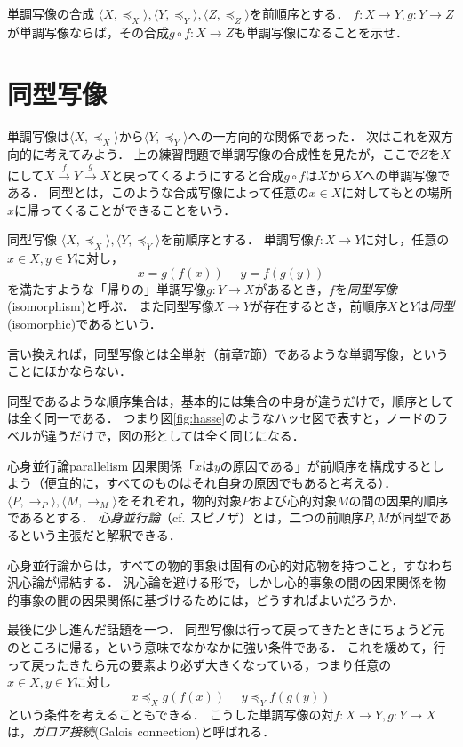 \documentclass[dvipdfmx,11pt,a4paper]{jsarticle}
\begin{document}
\begin{renshu}{単調写像の合成}{}
$\langle X, \preceq_X \rangle, \langle Y, \preceq_Y \rangle, \langle Z, \preceq_Z \rangle$を前順序とする．
$f:X \to Y, g:Y \to Z$が単調写像ならば，その合成$g \circ f: X \to Z$も単調写像になることを示せ． 
\end{renshu}


\section{同型写像}
単調写像は$\langle X, \preceq_X \rangle$から$\langle Y, \preceq_Y \rangle$への一方向的な関係であった．
次はこれを双方向的に考えてみよう．
上の練習問題で単調写像の合成性を見たが，ここで$Z$を$X$にして$X \xrightarrow{f} Y \xrightarrow{g} X$と戻ってくるようにすると合成$g \circ f$は$X$から$X$への単調写像である．
同型とは，このような合成写像によって任意の$x \in X$に対してもとの場所$x$に帰ってくることができることをいう．

\begin{dfn}{同型写像}{}
$\langle X, \preceq_X \rangle, \langle Y, \preceq_Y \rangle$を前順序とする．
単調写像$f:X \to Y$に対し，任意の$x \in X, y \in Y$に対し，
\[
 x = g(f(x)) \ \ \ \ \ \ y = f(g(y))
\]
を満たすような「帰りの」単調写像$g:Y \to X$があるとき，$f$を\emph{同型写像}(isomorphism)と呼ぶ．
また同型写像$X \to Y$が存在するとき，前順序$X$と$Y$は\emph{同型}(isomorphic)であるという．
\end{dfn}
言い換えれば，同型写像とは全単射（前章7節）であるような単調写像，ということにほかならない．

同型であるような順序集合は，基本的には集合の中身が違うだけで，順序としては全く同一である．
つまり図\ref{fig:hasse}のようなハッセ図で表すと，ノードのラベルが違うだけで，図の形としては全く同じになる．


\begin{rei}{心身並行論}{parallelism}
因果関係「$x$は$y$の原因である」が前順序を構成するとしよう（便宜的に，すべてのものはそれ自身の原因でもあると考える）．
$\langle P, \to_P \rangle, \langle M, \to_M \rangle$をそれぞれ，物的対象$P$および心的対象$M$の間の因果的順序であるとする．
\emph{心身並行論}（cf. スピノザ）とは，二つの前順序$P, M$が同型であるという主張だと解釈できる．
\end{rei}

\begin{hatten}{}{}
心身並行論からは，すべての物的事象は固有の心的対応物を持つこと，すなわち汎心論が帰結する．
汎心論を避ける形で，しかし心的事象の間の因果関係を物的事象の間の因果関係に基づけるためには，どうすればよいだろうか．
\end{hatten}

最後に少し進んだ話題を一つ．
同型写像は行って戻ってきたときにちょうど元のところに帰る，という意味でなかなかに強い条件である．
これを緩めて，行って戻ったきたら元の要素より必ず大きくなっている，つまり任意の$x \in X, y \in Y$に対し
\[
 x \preceq_X g(f(x)) \ \ \ \ \ \ y \preceq_Y f(g(y))
\]
という条件を考えることもできる．
こうした単調写像の対$f:X \to Y, g:Y \to X$は，\emph{ガロア接続}(Galois connection)と呼ばれる．
\end{document}

